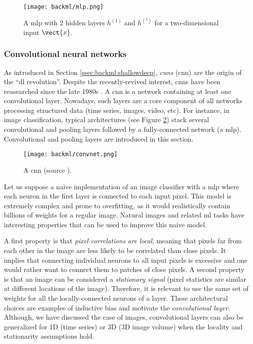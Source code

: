 \begin{figure}
  \centering
  \texttt{[image: backml/mlp.png]}
  \caption{A \acrlong{mlp} with 2 hidden layers $h^{(1)}$ and $h^{(^2)}$ for a two-dimensional input $\vect{x}$.}
  \label{fig:backml:mlp}
\end{figure}

\subsubsection{Convolutional neural networks}
\label{sssec:backml:dl:cnn}

As introduced in Section \ref{ssec:backml:shallowdeep}, \textit{\acrlong{cnn}s} (\acrshort{cnn}) are the origin of the ``\acrlong{dl} revolution''. Despite the recently-revived interest, \acrshort{cnn}s have been reasearched since the late 1980s \parencite{lecun1989handwritten}. A \acrshort{cnn} is a network containing at least one convolutional layer. Nowadays, such layers are a core component of all networks processing structured data (time series, images, video, etc). For instance, in image classification, typical architectures (see Figure \ref{fig:backml:cnn}) stack several convolutional and pooling layers followed by a fully-connected network (\ie a \acrshort{mlp}). Convolutional and pooling layers are introduced in this section.

\begin{figure}
 \centering
 \texttt{[image: backml/convnet.png]}
 \caption{A \acrlong{cnn} (source \parencite{millar2019using}).}
 \label{fig:backml:cnn}
\end{figure}

Let us suppose a naive implementation of an image classifier with a \acrshort{mlp} where each neuron in the first layer is connected to each input pixel. This model is extremely complex and prone to overfitting, as it would realistically contain billions of weights for a regular image. Natural images and related \acrlong{ml} tasks have interesting properties that can be used to improve this naive model. 

A first property is that \textit{pixel correlations are local}, meaning that pixels far from each other in the image are less likely to be correlated than close pixels. It implies that connecting individual neurons to all input pixels is excessive and one would rather want to connect them to patches of close pixels. A second property is that an image can be considered a \textit{stationary signal} (\ie pixel statistics are similar at different locations of the image). Therefore, it is relevant to use the same set of weights for all the locally-connected neurons of a layer. These architectural choices are examples of inductive bias and motivate the \textit{convolutional layer}. Although, we have discussed the case of images, convolutional layers can also be generalized for 1D (\eg time series) or 3D (\eg 3D image volume) when the locality and stationarity assumptions hold.   

